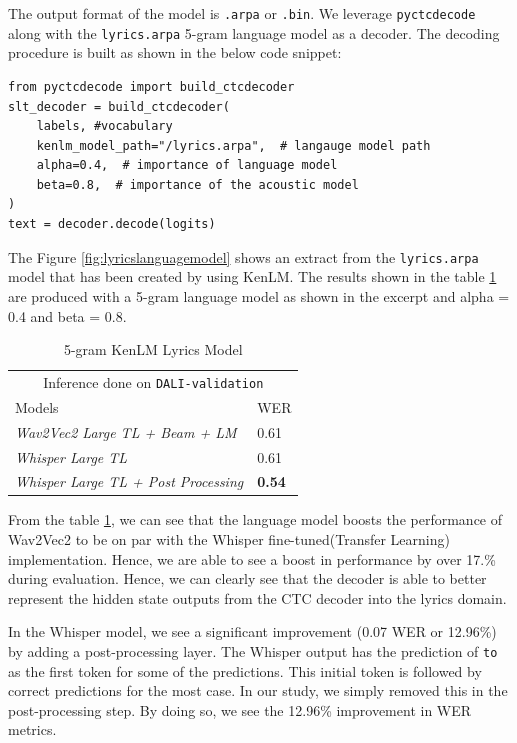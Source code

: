 The output format of the model is \texttt{.arpa} or \texttt{.bin}. We leverage \texttt{pyctcdecode} \cite{KenshoTechnologies} along with the \texttt{lyrics.arpa} 5-gram language model as a decoder. The decoding procedure is built as shown in the below code snippet\cite{KenshoTechnologies}:

\begin{verbatim}
from pyctcdecode import build_ctcdecoder
slt_decoder = build_ctcdecoder(
    labels, #vocabulary
    kenlm_model_path="/lyrics.arpa",  # langauge model path
    alpha=0.4,  # importance of language model
    beta=0.8,  # importance of the acoustic model
)
text = decoder.decode(logits)
\end{verbatim}

The Figure \ref{fig:lyricslanguagemodel} shows an extract from the \texttt{lyrics.arpa} model that has been created by using KenLM. The results shown in the table \ref{ngram-table} are produced with a 5-gram language model as shown in the excerpt and alpha = 0.4 and beta = 0.8.

\renewcommand{\arraystretch}{2}
\setlength{\arrayrulewidth}{0.3mm}
\begin{table}[H]
\small
\begin{center}
\begin{tabular}{ |p{7cm}| p{2cm}| }
\multicolumn{2}{c}{Inference done on \texttt{DALI-validation}} \\
\cline{1-2}
 Models     & WER  \\
\hline  \hline
\textit{Wav2Vec2 Large TL + Beam + LM} &  0.61  \\
\textit{Whisper Large TL} &  0.61  \\
\textit{Whisper Large TL + Post Processing}  & \textbf{0.54}\\
\hline  \hline
\end{tabular}
\caption{\label{ngram-table} 5-gram KenLM Lyrics Model}
\end{center}
\end{table}


From the table \ref{ngram-table}, we can see that the language model boosts the performance of Wav2Vec2 to be on par with the Whisper fine-tuned(Transfer Learning) implementation. Hence, we are able to see a boost in performance by over 17.\% during evaluation. Hence, we can clearly see that the decoder is able to better represent the hidden state outputs from the CTC decoder into the lyrics domain.

In the Whisper model, we see a significant improvement (0.07 WER or 12.96\%) by adding a post-processing layer. The Whisper output has the prediction of \texttt{to} as the first token for some of the predictions. This initial token is followed by correct predictions for the most case. In our study, we simply removed this in the post-processing step. By doing so, we see the 12.96\% improvement in WER metrics.

